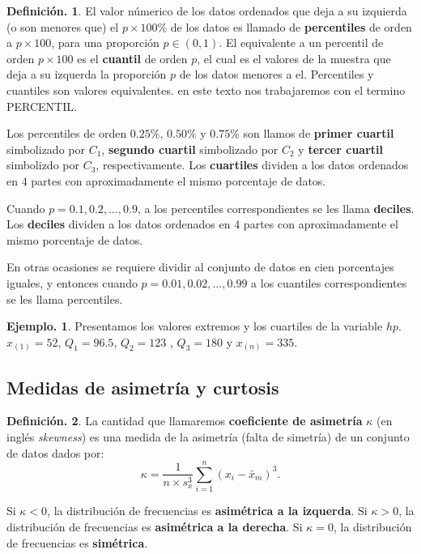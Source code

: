 \documentclass[]{book}
\theoremstyle{definition}
\newtheorem{definition}{Definición.}[chapter]
\theoremstyle{definition}
\newtheorem{example}{Ejemplo.}[chapter]
\theoremstyle{definition}
\theoremstyle{remark}
\begin{document}
\begin{definition}
\protect\hypertarget{def:unnamed-chunk-94}{}{\label{def:unnamed-chunk-94} }
El valor númerico de los datos ordenados que deja a su
izquierda (o son menores que) el \(p \times 100\%\) de los datos es llamado de \textbf{percentiles} de
orden a \(p\times 100\), para una proporción
\(p\in (0,1)\). El equivalente a un percentil de orden
\(p\times 100\) es el \textbf{cuantil} de orden \(p\), el cual es
el
valores de la muestra que deja a su izquerda la
proporción \(p\) de los datos menores a el. Percentiles y
cuantiles son valores equivalentes. en este texto nos
trabajaremos con el termino PERCENTIL.

Los percentiles de orden \(0.25\%\), \(0.50\%\) y \(0.75\%\)
son llamos de \textbf{primer cuartil} simbolizado por \(C_1\),
\textbf{segundo cuartil} simbolizado por \(C_2\) y \textbf{tercer
cuartil} simbolizdo por \(C_3\), respectivamente. Los
\textbf{cuartiles}
dividen a los datos ordenados en \(4\) partes con
aproximadamente el
mismo porcentaje de datos.

Cuando \(p = 0.1, 0.2, \ldots , 0.9\), a los percentiles
correspondientes se les llama \textbf{deciles}. Los
\textbf{deciles} dividen a
los datos ordenados en \(4\) partes con aproximadamente el
mismo
porcentaje de datos.

En otras ocasiones se requiere dividir al conjunto de
datos en cien porcentajes iguales, y
entonces cuando \(p = 0.01, 0.02, \ldots , 0.99\) a los
cuantiles correspondientes se les llama
percentiles.
\end{definition}

\begin{example}
\protect\hypertarget{exm:unnamed-chunk-95}{}{\label{exm:unnamed-chunk-95} }Presentamos los valores extremos y los cuartiles de la
variable \(hp\).
\(x_{(1)}= 52\), \(Q_1= 96.5\), \(Q_2 = 123\) , \(Q_3 = 180\) y
\(x_{(n)}= 335\).
\end{example}

\hypertarget{medidas-de-asimetruxeda-y-curtosis}{%
\subsection{Medidas de asimetría y curtosis}\label{medidas-de-asimetruxeda-y-curtosis}}

\begin{definition}
\protect\hypertarget{def:unnamed-chunk-96}{}{\label{def:unnamed-chunk-96} }La cantidad que llamaremos \textbf{coeficiente de asimetría}
\(\kappa\) (en inglés \emph{skewness})
es una medida de la asimetría (falta de simetría) de un
conjunto de datos dados por:
\[ \kappa = \frac{1}{n \times s_x^3} \sum_{i=1}^n (x_i -
                                      \bar{x}_m)^3. \]

Si \(\kappa < 0\), la distribución de frecuencias es
\textbf{asimétrica a la izquerda}. Si \(\kappa >0\),
la distribución de frecuencias es \textbf{asimétrica a la
derecha}. Si \(\kappa=0\), la distribución de
frecuencias es \textbf{simétrica}.
\end{definition}
\end{document}
